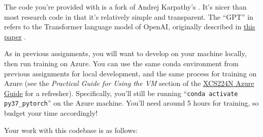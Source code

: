 
The code you're provided with is a fork of Andrej Karpathy's \href{https://github.com/karpathy/minGPT}{\mingpt}.
It's nicer than most research code in that it's relatively simple and transparent.
The ``GPT'' in \mingpt refers to the Transformer language model of OpenAI, originally described in \href{https://s3-us-west-2.amazonaws.com/openai-assets/research-covers/language-unsupervised/language_understanding_paper.pdf}{this paper} \cite{radford2018improving}.


As in previous assignments, you will want to develop on your machine locally, then run training on Azure. You can use the same conda environment from previous assignments for local development, and the same process for training on Azure (see the \textit{Practical Guide for Using the VM} section of the \href{https://docs.google.com/document/d/10J520Vnb1LnAMo0qgSYpG5cEEbomqQ371NIqg1IAv-4/edit?usp=sharing}{XCS224N Azure Guide} for a refresher). Specifically, you'll still be running ``\texttt{conda activate py37\_pytorch}'' on the Azure machine. You'll need around 5 hours for training, so budget your time accordingly!

Your work with this codebase is as follows:

